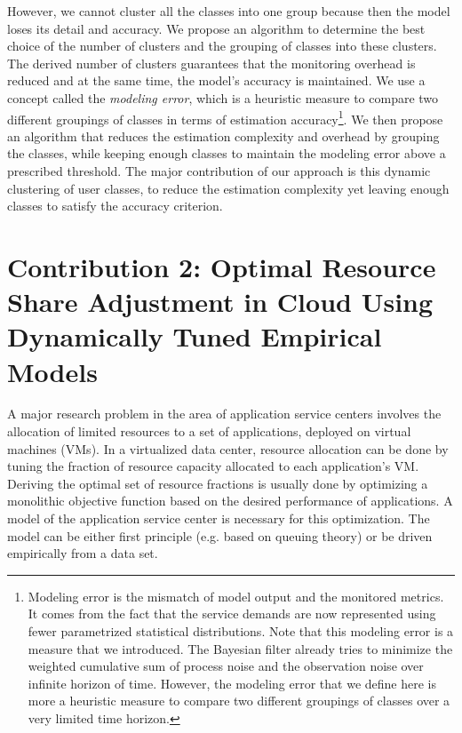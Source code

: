  However, we cannot cluster all the classes into one group  because then the model loses its detail and accuracy. 
We propose an algorithm to determine the best choice of the number of clusters and the grouping of classes into these clusters.
The derived number of clusters guarantees that the monitoring overhead is reduced and at the same time, the model's accuracy is maintained. 
We use a concept called the \textit{modeling error}, which is a heuristic measure to compare two different groupings of classes in terms of estimation accuracy\footnote{Modeling error is the mismatch of model output and the monitored metrics. It comes from the fact that the service demands are now represented using fewer parametrized statistical distributions. Note that this modeling error is a measure that we introduced. 
The Bayesian filter already tries to minimize the weighted cumulative sum of process noise and the observation noise over infinite horizon of time. However, the modeling error that we define here is more a heuristic measure to compare two different groupings of classes over a very limited time horizon. }.
We then propose an algorithm  that reduces the estimation complexity and overhead by grouping the classes, while keeping enough classes to  maintain the modeling error above a prescribed threshold. The major contribution of our approach is this dynamic clustering of user classes, to reduce the estimation complexity yet leaving enough classes to satisfy the accuracy criterion.  


 \section{Contribution 2: Optimal Resource Share Adjustment in Cloud Using Dynamically Tuned Empirical Models}    
\label{optimization_no_reconfiguration_cost} 
 A major research problem in the area of application service centers involves the allocation of limited resources to a set of applications, deployed on virtual machines (VMs). In a virtualized data center, resource allocation can be done by tuning the fraction of resource capacity allocated to each application's VM. 
Deriving the optimal set of resource fractions is usually done by optimizing a monolithic objective function based on the desired performance of applications. A model of the application service center is necessary for this optimization. The model can be either first principle (e.g. based on queuing theory) or be driven empirically from a data set.
 

